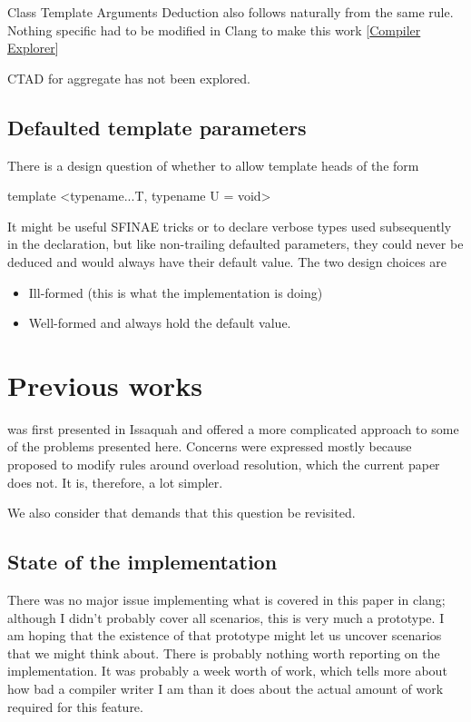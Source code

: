 \documentclass{wg21}
\begin{document}
Class Template Arguments Deduction also follows naturally from the same rule.
Nothing specific had to be modified in Clang to make this work [\href{https://godbolt.org/z/hMEav8z7j }{Compiler Explorer}]

CTAD for aggregate has not been explored.

\subsection{Defaulted template parameters}

There is a design question of whether to allow template heads of the form
\begin{colorblock}
template <typename...T, typename U = void>
\end{colorblock}

It might be useful SFINAE tricks or to declare verbose types used subsequently in the declaration,
but like non-trailing defaulted parameters, they could never be deduced and would always have their default value.
The two design choices are
\begin{itemize}
\item Ill-formed (this is what the implementation is doing)
\item Well-formed and always hold the default value.
\end{itemize}

\section{Previous works}

 was first presented in Issaquah and offered a more complicated approach to some of the problems presented here.
Concerns were expressed mostly because  proposed to modify rules around overload resolution, which the current paper does not. It is, therefore, a lot simpler.

We also consider that  demands that this question be revisited.

\subsection{State of the implementation}

There was no major issue implementing what is covered in this paper in clang; although I didn't probably cover all scenarios, this is very much a prototype.
I am hoping that the existence of that prototype might let us uncover scenarios that we might think about.
There is probably nothing worth reporting on the implementation.
It was probably a week worth of work, which tells more about how bad a compiler writer I am than it does about
the actual amount of work required for this feature.
\end{document}
